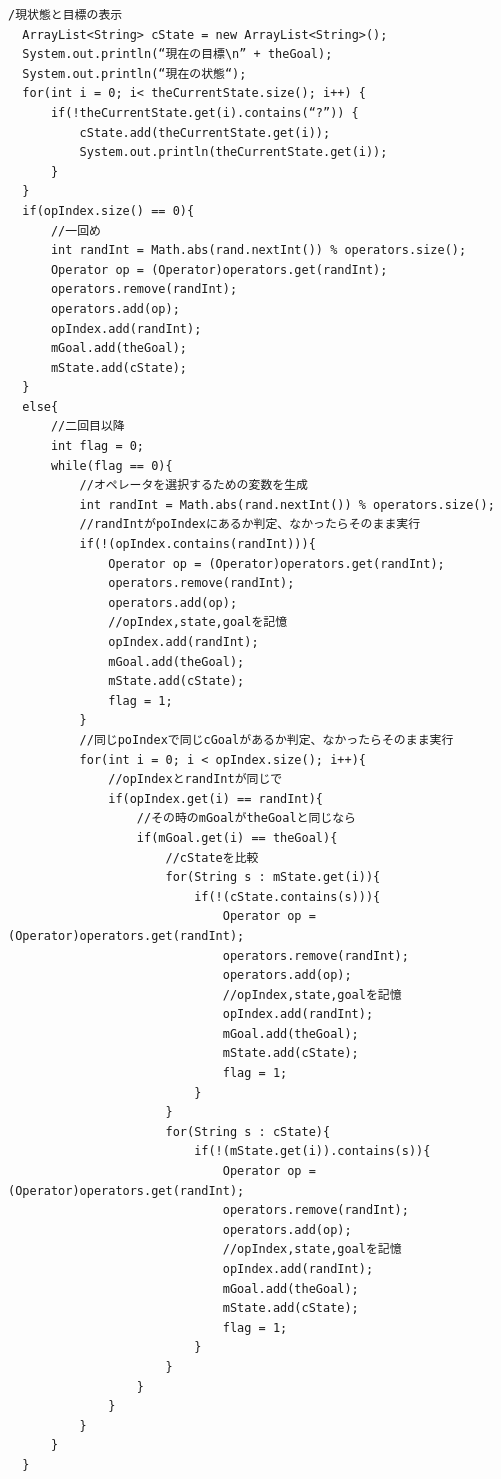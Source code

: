 \documentclass[uplatex,12pt]{jsarticle}
\begin{document}
\begin{lstlisting}[caption=繰り返し防止の処理, label=mid]
  /現状態と目標の表示
  ArrayList<String> cState = new ArrayList<String>();
  System.out.println(“現在の目標\n” + theGoal);
  System.out.println(“現在の状態“);
  for(int i = 0; i< theCurrentState.size(); i++) {
      if(!theCurrentState.get(i).contains(“?”)) {
          cState.add(theCurrentState.get(i));
          System.out.println(theCurrentState.get(i));
      }
  }
  if(opIndex.size() == 0){
      //一回め
      int randInt = Math.abs(rand.nextInt()) % operators.size();
      Operator op = (Operator)operators.get(randInt);
      operators.remove(randInt);
      operators.add(op);
      opIndex.add(randInt);
      mGoal.add(theGoal);
      mState.add(cState);
  }
  else{
      //二回目以降
      int flag = 0;
      while(flag == 0){
          //オペレータを選択するための変数を生成
          int randInt = Math.abs(rand.nextInt()) % operators.size();
          //randIntがpoIndexにあるか判定、なかったらそのまま実行
          if(!(opIndex.contains(randInt))){
              Operator op = (Operator)operators.get(randInt);
              operators.remove(randInt);
              operators.add(op);
              //opIndex,state,goalを記憶
              opIndex.add(randInt);
              mGoal.add(theGoal);
              mState.add(cState);
              flag = 1;
          }
          //同じpoIndexで同じcGoalがあるか判定、なかったらそのまま実行
          for(int i = 0; i < opIndex.size(); i++){
              //opIndexとrandIntが同じで
              if(opIndex.get(i) == randInt){
                  //その時のmGoalがtheGoalと同じなら
                  if(mGoal.get(i) == theGoal){
                      //cStateを比較
                      for(String s : mState.get(i)){
                          if(!(cState.contains(s))){
                              Operator op = (Operator)operators.get(randInt);
                              operators.remove(randInt);
                              operators.add(op);
                              //opIndex,state,goalを記憶
                              opIndex.add(randInt);
                              mGoal.add(theGoal);
                              mState.add(cState);
                              flag = 1;
                          }
                      }
                      for(String s : cState){
                          if(!(mState.get(i)).contains(s)){
                              Operator op = (Operator)operators.get(randInt);
                              operators.remove(randInt);
                              operators.add(op);
                              //opIndex,state,goalを記憶
                              opIndex.add(randInt);
                              mGoal.add(theGoal);
                              mState.add(cState);
                              flag = 1;
                          }
                      }
                  }
              }
          }
      }
  }
\end{lstlisting}
\end{document}
